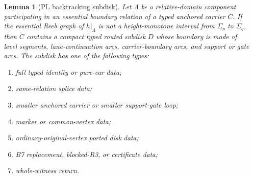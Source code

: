 \documentclass[11pt]{amsart}
\newtheorem{lemma}[theorem]{Lemma}
\theoremstyle{definition}
\begin{document}
\begin{lemma}[PL backtracking subdisk]
Let \(\Lambda\) be a relative-domain component participating in an essential boundary relation of a typed anchored carrier \(C\). If the essential Reeb graph of \(h|_\Lambda\) is not a height-monotone interval from \(\Sigma_p\) to \(\Sigma_q\), then \(C\) contains a compact typed routed subdisk \(D\) whose boundary is made of level segments, lane-continuation arcs, carrier-boundary arcs, and support or gate arcs. The subdisk has one of the following types:

\begin{enumerate}
\item full typed identity or pure-ear data;
\item same-relation splice data;
\item smaller anchored carrier or smaller support-gate loop;
\item marker or common-vertex data;
\item ordinary-original-vertex ported disk data;
\item B7 replacement, blocked-R3, or certificate data;
\item whole-witness return.
\end{enumerate}

\end{lemma}
\end{document}
